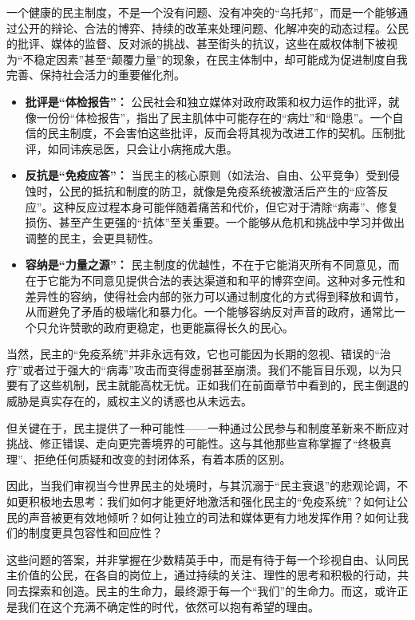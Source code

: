 \documentclass[UTF8, 10pt]{ctexbook}
\begin{document}
一个健康的民主制度，不是一个没有问题、没有冲突的“乌托邦”，而是一个能够通过公开的辩论、合法的博弈、持续的改革来处理问题、化解冲突的动态过程。公民的批评、媒体的监督、反对派的挑战、甚至街头的抗议，这些在威权体制下被视为“不稳定因素”甚至“颠覆力量”的现象，在民主体制中，却可能成为促进制度自我完善、保持社会活力的重要催化剂。
\begin{itemize}
    \item \textbf{批评是“体检报告”：} 公民社会和独立媒体对政府政策和权力运作的批评，就像一份份“体检报告”，指出了民主肌体中可能存在的“病灶”和“隐患”。一个自信的民主制度，不会害怕这些批评，反而会将其视为改进工作的契机。压制批评，如同讳疾忌医，只会让小病拖成大患。
    \item \textbf{反抗是“免疫应答”：} 当民主的核心原则（如法治、自由、公平竞争）受到侵蚀时，公民的抵抗和制度的防卫，就像是免疫系统被激活后产生的“应答反应”。这种反应过程本身可能伴随着痛苦和代价，但它对于清除“病毒”、修复损伤、甚至产生更强的“抗体”至关重要。一个能够从危机和挑战中学习并做出调整的民主，会更具韧性。
    \item \textbf{容纳是“力量之源”：} 民主制度的优越性，不在于它能消灭所有不同意见，而在于它能为不同意见提供合法的表达渠道和和平的博弈空间。这种对多元性和差异性的容纳，使得社会内部的张力可以通过制度化的方式得到释放和调节，从而避免了矛盾的极端化和暴力化。一个能够容纳反对声音的政府，通常比一个只允许赞歌的政府更稳定，也更能赢得长久的民心。
\end{itemize}
当然，民主的“免疫系统”并非永远有效，它也可能因为长期的忽视、错误的“治疗”或者过于强大的“病毒”攻击而变得虚弱甚至崩溃。我们不能盲目乐观，以为只要有了这些机制，民主就能高枕无忧。正如我们在前面章节中看到的，民主倒退的威胁是真实存在的，威权主义的诱惑也从未远去。

但关键在于，民主提供了一种可能性——一种通过公民参与和制度革新来不断应对挑战、修正错误、走向更完善境界的可能性。这与其他那些宣称掌握了“终极真理”、拒绝任何质疑和改变的封闭体系，有着本质的区别。

因此，当我们审视当今世界民主的处境时，与其沉溺于“民主衰退”的悲观论调，不如更积极地去思考：我们如何才能更好地激活和强化民主的“免疫系统”？如何让公民的声音被更有效地倾听？如何让独立的司法和媒体更有力地发挥作用？如何让我们的制度更具包容性和回应性？

这些问题的答案，并非掌握在少数精英手中，而是有待于每一个珍视自由、认同民主价值的公民，在各自的岗位上，通过持续的关注、理性的思考和积极的行动，共同去探索和创造。民主的生命力，最终源于每一个“我们”的生命力。而这，或许正是我们在这个充满不确定性的时代，依然可以抱有希望的理由。

\end{document}
